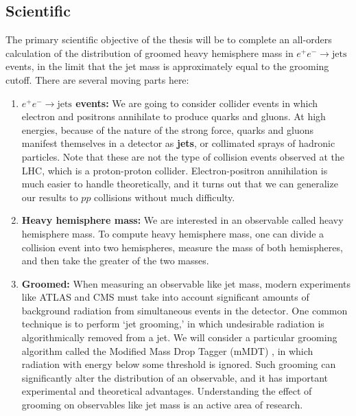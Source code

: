 \documentclass[../thesis.tex]{subfiles}
\begin{document}
\subsection{Scientific}
	The primary scientific objective of the thesis will be to complete an all-orders calculation of the distribution of groomed heavy hemisphere mass in $e^+ e^- \to \text{jets}$ events, in the limit that the jet mass is approximately equal to the grooming cutoff. There are several moving parts here:
	\begin{enumerate}
		\item \textbf{$e^+ e^- \to \text{jets}$ events:} We are going to consider collider events in which electron and positrons annihilate to produce quarks and gluons. At high energies, because of the nature of the strong force, quarks and gluons manifest themselves in a detector as \textbf{jets}, or collimated sprays of hadronic particles. Note that these are not the type of collision events observed at the LHC, which is a proton-proton collider. Electron-positron annihilation is much easier to handle theoretically, and it turns out that we can generalize our results to $pp$ collisions without much difficulty.

		\item \textbf{Heavy hemisphere mass:} We are interested in an observable called heavy hemisphere mass. To compute heavy hemisphere mass, one can divide a collision event into two hemispheres, measure the mass of both hemispheres, and then take the greater of the two masses.

		\item \textbf{Groomed:} When measuring an observable like jet mass, modern experiments like ATLAS and CMS must take into account significant amounts of background radiation from simultaneous events in the detector. One common technique is to perform `jet grooming,' in which undesirable radiation is algorithmically removed from a jet. We will consider a particular grooming algorithm called the Modified Mass Drop Tagger (mMDT) \cite{dasgupta_towards_2013}, in which radiation with energy below some threshold is ignored. Such grooming can significantly alter the distribution of an observable, and it has important experimental and theoretical advantages. Understanding the effect of grooming on observables like jet mass is an active area of research.


\end{enumerate}
\end{document}
